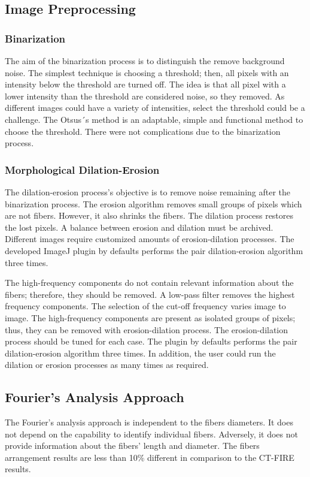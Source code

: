 \documentclass[12pt,a4paper]{article}
\begin{document}
\subsection{Image  Preprocessing}
\subsubsection{Binarization}
The aim of the binarization process is to distinguish the remove background noise. The simplest technique is choosing a threshold; then, all pixels with an intensity below the threshold are turned off. The idea is that all pixel with a lower intensity than the threshold are considered noise, so they removed. As different images could have a variety of intensities, select the threshold could be a challenge. The Otsus´s method is an adaptable, simple and functional method to choose the threshold. There were not complications due to the binarization process.

\subsubsection{Morphological Dilation-Erosion}
The dilation-erosion process's objective is to remove noise remaining after the binarization process. The erosion algorithm removes small groups of pixels which are not fibers. However, it also shrinks the fibers. The dilation process restores the lost pixels. A balance between erosion and dilation must be archived. Different images require customized amounts of erosion-dilation processes. The developed ImageJ plugin by defaults performs the pair dilation-erosion algorithm three times. 

The high-frequency components do not contain relevant information about the fibers; therefore, they should be removed. A low-pass filter removes the highest frequency components. The selection of the cut-off frequency varies image to image. The high-frequency components are present as isolated groups of pixels; thus, they can be removed with erosion-dilation process. The erosion-dilation process should be tuned for each case. The plugin by defaults performs the pair dilation-erosion algorithm three times. In addition, the user could run the dilation or erosion processes as many times as required.

\subsection{Fourier’s Analysis Approach}
The Fourier's analysis approach is independent to the fibers diameters. It does not depend on the capability to identify individual fibers. Adversely, it does not provide information about the fibers' length and diameter. The fibers arrangement results are less than 10\% different in comparison to the CT-FIRE results. 
\end{document}
